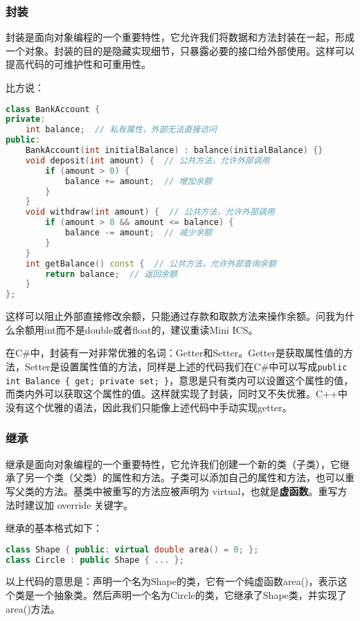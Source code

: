 \documentclass[../main.tex]{subfiles}
\begin{document}
\subsubsection{封装}

封装是面向对象编程的一个重要特性，它允许我们将数据和方法封装在一起，形成一个对象。封装的目的是隐藏实现细节，只暴露必要的接口给外部使用。这样可以提高代码的可维护性和可重用性。

比方说：
\begin{lstlisting}[language=C++]
class BankAccount {
private:
    int balance;  // 私有属性，外部无法直接访问
public:
    BankAccount(int initialBalance) : balance(initialBalance) {}
    void deposit(int amount) {  // 公共方法，允许外部调用
        if (amount > 0) {
            balance += amount;  // 增加余额
        }
    }
    void withdraw(int amount) {  // 公共方法，允许外部调用
        if (amount > 0 && amount <= balance) {
            balance -= amount;  // 减少余额
        }
    }
    int getBalance() const {  // 公共方法，允许外部查询余额
        return balance;  // 返回余额
    }
};
\end{lstlisting}
这样可以阻止外部直接修改余额，只能通过存款和取款方法来操作余额。问我为什么余额用int而不是double或者float的，建议重读Mini ICS。

\begin{tip}
  在C\#中，封装有一对非常优雅的名词：Getter和Setter。Getter是获取属性值的方法，Setter是设置属性值的方法，同样是上述的代码我们在C\#中可以写成\texttt{public int Balance \{ get; private set; \}}，意思是只有类内可以设置这个属性的值，而类内外可以获取这个属性的值。这样就实现了封装，同时又不失优雅。C++中没有这个优雅的语法，因此我们只能像上述代码中手动实现getter。
\end{tip}

\subsubsection{继承}

继承是面向对象编程的一个重要特性，它允许我们创建一个新的类（子类），它继承了另一个类（父类）的属性和方法。子类可以添加自己的属性和方法，也可以重写父类的方法。基类中被重写的方法应被声明为 virtual，也就是\textbf{虚函数}。重写方法时建议加 override 关键字。

继承的基本格式如下：
\begin{lstlisting}[language=C++]
class Shape { public: virtual double area() = 0; };
class Circle : public Shape { ... };
\end{lstlisting}
以上代码的意思是：声明一个名为Shape的类，它有一个纯虚函数area()，表示这个类是一个抽象类。然后声明一个名为Circle的类，它继承了Shape类，并实现了area()方法。
\end{document}
